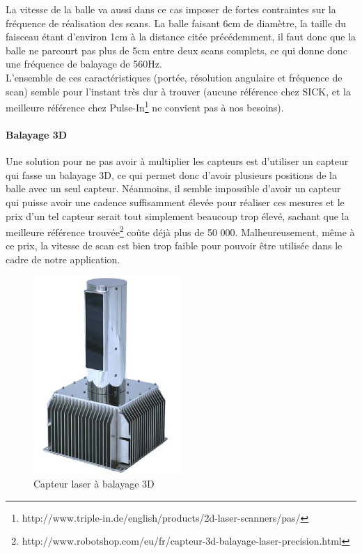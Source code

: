La vitesse de la balle va aussi dans ce cas imposer de fortes contraintes sur la fréquence de réalisation des scans. La balle faisant 6cm de diamètre, la taille du faisceau étant d'environ 1cm à la distance citée précédemment, il faut donc que la balle ne parcourt pas plus de 5cm entre deux scans complets, ce qui donne donc une fréquence de balayage de 560Hz. \\

L'ensemble de ces caractéristiques (portée, résolution angulaire et fréquence de scan) semble pour l'instant très dur à trouver (aucune référence chez SICK, et la meilleure référence chez Pulse-In\footnote{http://www.triple-in.de/english/products/2d-laser-scanners/pas/} ne convient pas à nos besoins). 


\paragraph{Balayage 3D\\}

Une solution pour ne pas avoir à multiplier les capteurs est d'utiliser un capteur qui fasse un balayage 3D, ce qui permet donc d'avoir plusieurs positions de la balle avec un seul capteur. Néanmoins, il semble impossible d'avoir un capteur qui puisse avoir une cadence suffisamment élevée pour réaliser ces mesures et le prix d'un tel capteur serait tout simplement beaucoup trop élevé, sachant que la meilleure référence trouvée\footnote{http://www.robotshop.com/eu/fr/capteur-3d-balayage-laser-precision.html} coûte déjà plus de 50 000\texteuro. Malheureusement, même à ce prix, la vitesse de scan est bien trop faible pour pouvoir être utilisée dans le cadre de notre application. 	

\begin{figure}[h]
\begin{center}
\includegraphics{laserbalyage3d.png}
\caption{Capteur laser à balayage 3D}
\label{img:laser3d}
\end{center}
\end{figure}

